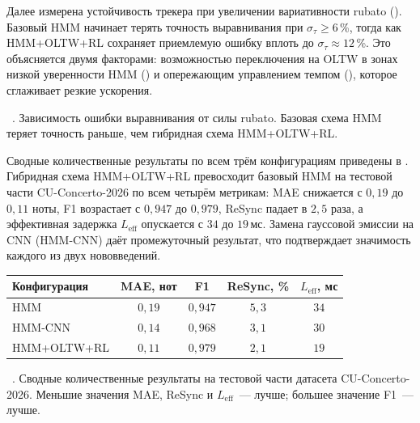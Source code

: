 Далее измерена устойчивость трекера при увеличении вариативности
rubato (). Базовый HMM начинает терять точность
выравнивания при $\sigma_\tau \ge 6$\,\%, тогда как HMM+OLTW+RL
сохраняет приемлемую ошибку вплоть до $\sigma_\tau\approx 12$\,\%.
Это объясняется двумя факторами: возможностью переключения на OLTW в
зонах низкой уверенности HMM () и опережающим
управлением темпом (), которое сглаживает резкие
ускорения.

\par\addvspace{2pt}
{\centering
{}%
\resizebox{\columnwidth}{!}{}\par
\vspace{2pt}
\footnotesize
\figurename~\thefigure. Зависимость ошибки выравнивания от силы
rubato. Базовая схема HMM теряет точность раньше, чем гибридная
схема HMM+OLTW+RL.\par}
\addvspace{4pt}

Сводные количественные результаты по всем трём конфигурациям
приведены в . Гибридная схема HMM+OLTW+RL
превосходит базовый HMM на тестовой части CU-Concerto-2026 по всем
четырём метрикам: MAE снижается с $0{,}19$ до $0{,}11$ ноты, F1
возрастает с $0{,}947$ до $0{,}979$, ReSync падает в $2{,}5$ раза, а
эффективная задержка $L_{\text{eff}}$ опускается с $34$ до $19$\,мс.
Замена гауссовой эмиссии на CNN (HMM-CNN) даёт промежуточный
результат, что подтверждает значимость каждого из двух нововведений.

\par\addvspace{2pt}
{\centering
{}%
\footnotesize
\begin{tabular}{@{}lcccc@{}}
  \toprule
  Конфигурация       & MAE, нот & F1     & ReSync, \% & $L_{\text{eff}}$, мс \\
  \midrule
  HMM                & $0{,}19$ & $0{,}947$ & $5{,}3$  & $34$ \\
  HMM-CNN            & $0{,}14$ & $0{,}968$ & $3{,}1$  & $30$ \\
  HMM+OLTW+RL        & $0{,}11$ & $0{,}979$ & $2{,}1$  & $19$ \\
  \bottomrule
\end{tabular}\par
\vspace{2pt}
\tablename~\thetable. Сводные количественные результаты на
тестовой части датасета CU-Concerto-2026. Меньшие значения MAE,
ReSync и $L_{\text{eff}}$~--- лучше; большее значение F1~--- лучше.\par}
\addvspace{4pt}

